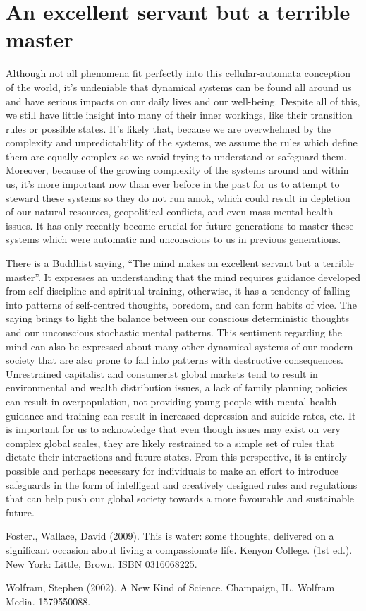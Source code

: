 \documentclass{article}
\begin{document}
\section{An excellent servant but a terrible master}

Although not all phenomena fit perfectly into this cellular-automata conception of the world, it's undeniable that dynamical systems can be found all around us and have serious impacts on our daily lives and our well-being. Despite all of this, we still have little insight into many of their inner workings, like their transition rules or possible states. It's likely that, because we are overwhelmed by the complexity and unpredictability of the systems, we assume the rules which define them are equally complex so we avoid trying to understand or safeguard them. Moreover, because of the growing complexity of the systems around and within us, it's more important now than ever before in the past for us to attempt to steward these systems so they do not run amok, which could result in depletion of our natural resources, geopolitical conflicts, and even mass mental health issues. It has only recently become crucial for future generations to master these systems which were automatic and unconscious to us in previous generations.

There is a Buddhist saying, ``The mind makes an excellent servant but a terrible master''. It expresses an understanding that the mind requires guidance developed from self-discipline and spiritual training, otherwise, it has a tendency of falling into patterns of self-centred thoughts, boredom, and can form habits of vice. The saying brings to light the balance between our conscious deterministic thoughts and our unconscious stochastic mental patterns. This sentiment regarding the mind can also be expressed about many other dynamical systems of our modern society that are also prone to fall into patterns with destructive consequences. Unrestrained capitalist and consumerist global markets tend to result in environmental and wealth distribution issues, a lack of family planning policies can result in overpopulation, not providing young people with mental health guidance and training can result in increased depression and suicide rates, etc. It is important for us to acknowledge that even though issues may exist on very complex global scales, they are likely restrained to a simple set of rules that dictate their interactions and future states. From this perspective, it is entirely possible and perhaps necessary for individuals to make an effort to introduce safeguards in the form of intelligent and creatively designed rules and regulations that can help push our global society towards a more favourable and sustainable future. 


\begin{thebibliography}{9}
Foster., Wallace, David (2009). This is water: some thoughts, delivered on a significant occasion about living a compassionate life. Kenyon College. (1st ed.). New York: Little, Brown. ISBN 0316068225.

Wolfram, Stephen (2002). A New Kind of Science. Champaign, IL. Wolfram Media. 1579550088.

\end{thebibliography}
\end{document}
